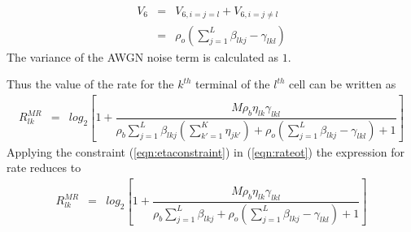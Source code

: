 \documentclass[10pt, a4paper, twoside,fleqn]{article}
\begin{document}
\begin{eqnarray}\label{eqn:v6}
   V_6 &=& V_{6,i=j=l} + V_{6,i=j\neq l} \nonumber \\ &=&\rho_o\left(\sum\limits_{j=1}^{L}\beta_{lkj}-\gamma_{lkl}\right)
\end{eqnarray}
The variance of the AWGN noise term is calculated as $1$.

Thus the value of the rate for the $k^{th}$ terminal of the $l^{th}$ cell can be written as
\begin{eqnarray}\label{eqn:rateot}
R_{lk}^{MR} %
        &=& log_2\left[1+\dfrac{M\rho_b\eta_{lk}\gamma_{lkl}}{\rho_b\sum\limits_{j=1}^{L}\beta_{lkj}\left(\sum\limits_{k'=1}^{K}\eta_{jk'}\right)+\rho_o\left(\sum\limits_{j=1}^{L}\beta_{lkj} -\gamma_{lkl}\right)+1}\right]
\end{eqnarray}
Applying the constraint (\ref{eqn:etaconstraint}) in (\ref{eqn:rateot}) the expression for rate reduces to
\begin{eqnarray}\label{eqn:finalratebt}
R_{lk}^{MR} &=& log_2\left[1+\dfrac{M\rho_b\eta_{lk}\gamma_{lkl}}{\rho_b\sum\limits_{j=1}^{L}\beta_{lkj}+\rho_o\left(\sum\limits_{j=1}^{L}\beta_{lkj} -\gamma_{lkl}\right)+1}\right]
\end{eqnarray}
\end{document}
